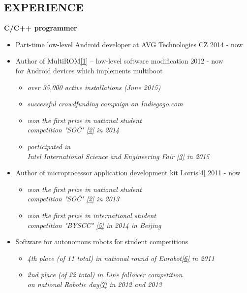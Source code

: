 \documentclass[margin]{res}
\begin{document}
\begin{resume}
\section{EXPERIENCE}
 {\bf C/C++ programmer}
 \begin{itemize} \itemsep -2pt
    \item Part-time low-level Android developer at AVG Technologies CZ \hfill{2014 - now}
    \item Author of MultiROM\hyperref[multirom]{[1]} -- low-level software modification \hfill{2012 - now} \\ for Android devices which implements multiboot
        \begin{itemize}
            \item \textit{over 35,000 active installations (June 2015)}
            \item \textit{successful crowdfunding campaign on Indiegogo.com}
            \item \textit{won the first prize in national student \\ competition "SOČ" \hyperref[soc]{[2]} in 2014}
            \item \textit{participated in\\Intel International Science and Engineering Fair \hyperref[isef]{[3]} in 2015}
        \end{itemize}
    \item Author of microprocessor application development kit Lorris\hyperref[lorris]{[4]} \hfill{2011 - now}
        \begin{itemize}
            \item \textit{won the first prize in national student \\ competition "SOČ" \hyperref[soc]{[2]} in 2013}
            \item \textit{won the first prize in international student \\ competition "BYSCC" \hyperref[byscc]{[5]} in 2014 in Beijing}
        \end{itemize}
    \item Software for autonomous robots for student competitions
        \begin{itemize}
            \item \textit{4th place (of 11 total) in national round of Eurobot\hyperref[eurobot]{[6]} in 2011}
            \item \textit{2nd place (of 22 total) in Line follower competition \\ on national Robotic day\hyperref[day]{[7]} in 2012 and 2013}

\end{itemize}
\end{itemize}
\end{resume}
\end{document}
